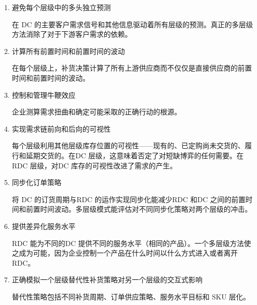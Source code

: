     \begin{enumerate}
        \item  避免每个层级中的多头独立预测

        在 DC 的主要客户需求信号和其他信息驱动着所有层级的预测。真正的多层级方法消除了对于下游客户需求的依赖。

        \item  计算所有前置时间和前置时间的波动

        在每个层级上，补货决策计算了所有上游供应商而不仅仅是直接供应商的前置时间和前置时间的波动。

        \item  控制和管理牛鞭效应

        企业测算需求扭曲和确定可能采取的正确行动的根源。

        \item  实现需求链前向和后向的可视性

        每个层级利用其他层级库存位置的可视性——现有的、已定购尚未交货的、履行和延期交货的。在DC 层级，这意味着否定了对短缺博弈的任何需要。在RDC 层级，对DC 库存的可视性改进了需求的产生。

        \item  同步化订单策略

        将 DC 的订货周期与RDC 的运作实现同步化能减少RDC 和DC 之间的前置时间和前置时间波动。多层级模式能评估对不同同步化策略对两个层级的冲击。

        \item  提供差异化服务水平

        RDC 能为不同的DC 提供不同的服务水平（相同的产品）。一个多层级方法使之成为可能，因为企业控制一个产品在什么时间以什么方式进入或者离开RDC。

        \item  正确模拟一个层级替代性补货策略对另一个层级的交互式影响

        替代性策略包括不同补货周期、订单供应策略、服务水平目标和 SKU 层化。
    \end{enumerate}
